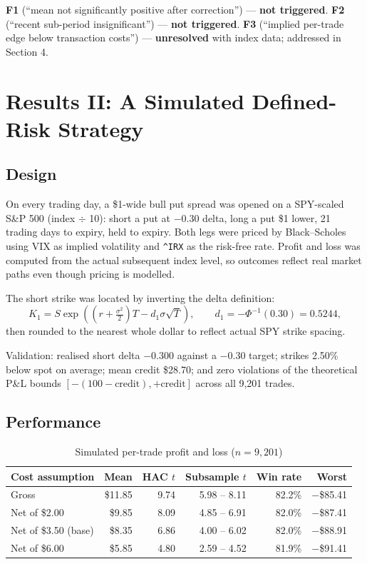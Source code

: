 \documentclass[11pt,a4paper]{article}
\begin{document}
\textbf{F1} (``mean not significantly positive after correction'') --- \textbf{not triggered}.
\textbf{F2} (``recent sub-period insignificant'') --- \textbf{not triggered}.
\textbf{F3} (``implied per-trade edge below transaction costs'') --- \textbf{unresolved} with index
data; addressed in Section 4.

\section{Results II: A Simulated Defined-Risk Strategy}

\subsection{Design}

On every trading day, a \$1-wide bull put spread was opened on a SPY-scaled S\&P 500 (index $\div$ 10):
short a put at $-0.30$ delta, long a put \$1 lower, 21 trading days to expiry, held to expiry. Both legs
were priced by Black--Scholes using VIX as implied volatility and \texttt{\^{}IRX} as the risk-free rate.
Profit and loss was computed from the actual subsequent index level, so outcomes reflect real market
paths even though pricing is modelled.

The short strike was located by inverting the delta definition:
\begin{equation}
K_1 = S \exp\!\left( \left(r + \tfrac{\sigma^2}{2}\right)T - d_1 \sigma \sqrt{T} \right),
\qquad d_1 = -\Phi^{-1}(0.30) = 0.5244,
\end{equation}
then rounded to the nearest whole dollar to reflect actual SPY strike spacing.

Validation: realised short delta $-0.300$ against a $-0.30$ target; strikes 2.50\% below spot on
average; mean credit \$28.70; and zero violations of the theoretical P\&L bounds
$[-(100-\text{credit}), +\text{credit}]$ across all 9,201 trades.

\subsection{Performance}

\begin{table}[h]
\centering
\caption{Simulated per-trade profit and loss ($n=9{,}201$)}
\begin{tabular}{@{}lrrrrr@{}}
\toprule
Cost assumption & Mean & HAC $t$ & Subsample $t$ & Win rate & Worst \\
\midrule
Gross & \$11.85 & 9.74 & 5.98 -- 8.11 & 82.2\% & $-$\$85.41 \\
Net of \$2.00 & \$9.85 & 8.09 & 4.85 -- 6.91 & 82.0\% & $-$\$87.41 \\
Net of \$3.50 (base) & \$8.35 & 6.86 & 4.00 -- 6.02 & 82.0\% & $-$\$88.91 \\
Net of \$6.00 & \$5.85 & 4.80 & 2.59 -- 4.52 & 81.9\% & $-$\$91.41 \\
\bottomrule
\end{tabular}
\end{table}
\end{document}
